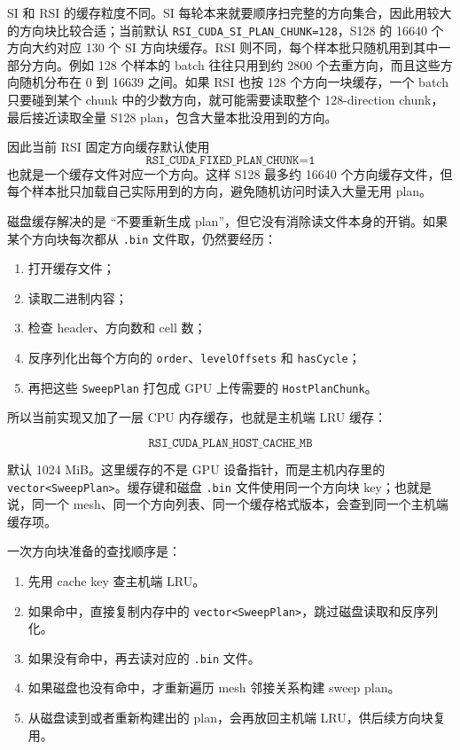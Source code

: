 \documentclass[10pt]{article}
\newcommand{\subsect}[1]{\vspace{2mm}{\sffamily\large\bfseries #1}\par}
\newcommand{\code}[1]{\texttt{#1}}
\begin{document}
SI 和 RSI 的缓存粒度不同。SI 每轮本来就要顺序扫完整的方向集合，因此用较大的方向块比较合适；当前默认 \code{RSI\_CUDA\_SI\_PLAN\_CHUNK=128}，S128 的 16640 个方向大约对应 130 个 SI 方向块缓存。RSI 则不同，每个样本批只随机用到其中一部分方向。例如 128 个样本的 batch 往往只用到约 2800 个去重方向，而且这些方向随机分布在 0 到 16639 之间。如果 RSI 也按 128 个方向一块缓存，一个 batch 只要碰到某个 chunk 中的少数方向，就可能需要读取整个 128-direction chunk，最后接近读取全量 S128 plan，包含大量本批没用到的方向。

因此当前 RSI 固定方向缓存默认使用
\[
\code{RSI\_CUDA\_FIXED\_PLAN\_CHUNK=1}
\]
也就是一个缓存文件对应一个方向。这样 S128 最多约 16640 个方向缓存文件，但每个样本批只加载自己实际用到的方向，避免随机访问时读入大量无用 plan。

\subsect{6.2 主机端 LRU 缓存}

磁盘缓存解决的是 ``不要重新生成 plan''，但它没有消除读文件本身的开销。如果某个方向块每次都从 \code{.bin} 文件取，仍然要经历：

\begin{enumerate}
\item 打开缓存文件；
\item 读取二进制内容；
\item 检查 header、方向数和 cell 数；
\item 反序列化出每个方向的 \code{order}、\code{levelOffsets} 和 \code{hasCycle}；
\item 再把这些 \code{SweepPlan} 打包成 GPU 上传需要的 \code{HostPlanChunk}。
\end{enumerate}

所以当前实现又加了一层 CPU 内存缓存，也就是主机端 LRU 缓存：

\[
\code{RSI\_CUDA\_PLAN\_HOST\_CACHE\_MB}
\]

默认 1024 MiB。这里缓存的不是 GPU 设备指针，而是主机内存里的 \code{vector<SweepPlan>}。缓存键和磁盘 \code{.bin} 文件使用同一个方向块 key；也就是说，同一个 mesh、同一个方向列表、同一个缓存格式版本，会查到同一个主机端缓存项。

一次方向块准备的查找顺序是：

\begin{enumerate}
\item 先用 cache key 查主机端 LRU。
\item 如果命中，直接复制内存中的 \code{vector<SweepPlan>}，跳过磁盘读取和反序列化。
\item 如果没有命中，再去读对应的 \code{.bin} 文件。
\item 如果磁盘也没有命中，才重新遍历 mesh 邻接关系构建 sweep plan。
\item 从磁盘读到或者重新构建出的 plan，会再放回主机端 LRU，供后续方向块复用。
\end{enumerate}
\end{document}
